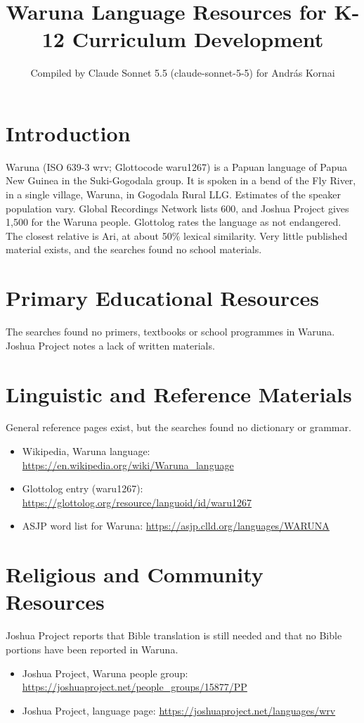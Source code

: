 \documentclass[12pt]{article}
\title{Waruna Language Resources for K-12 Curriculum Development}
\author{Compiled by Claude Sonnet 5.5 (claude-sonnet-5-5) for Andr\'as Kornai}
\date{}
\begin{document}
\maketitle

\section{Introduction}
Waruna (ISO 639-3 wrv; Glottocode waru1267) is a Papuan language of Papua New Guinea in the Suki-Gogodala group. It is spoken in a bend of the Fly River, in a single village, Waruna, in Gogodala Rural LLG. Estimates of the speaker population vary. Global Recordings Network lists 600, and Joshua Project gives 1,500 for the Waruna people. Glottolog rates the language as not endangered. The closest relative is Ari, at about 50\% lexical similarity. Very little published material exists, and the searches found no school materials.

\section{Primary Educational Resources}
The searches found no primers, textbooks or school programmes in Waruna. Joshua Project notes a lack of written materials.

\section{Linguistic and Reference Materials}
General reference pages exist, but the searches found no dictionary or grammar.
\begin{itemize}
\item Wikipedia, Waruna language: \url{https://en.wikipedia.org/wiki/Waruna_language}
\item Glottolog entry (waru1267): \url{https://glottolog.org/resource/languoid/id/waru1267}
\item ASJP word list for Waruna: \url{https://asjp.clld.org/languages/WARUNA}
\end{itemize}

\section{Religious and Community Resources}
Joshua Project reports that Bible translation is still needed and that no Bible portions have been reported in Waruna.
\begin{itemize}
\item Joshua Project, Waruna people group: \url{https://joshuaproject.net/people_groups/15877/PP}
\item Joshua Project, language page: \url{https://joshuaproject.net/languages/wrv}
\end{itemize}
\end{document}
